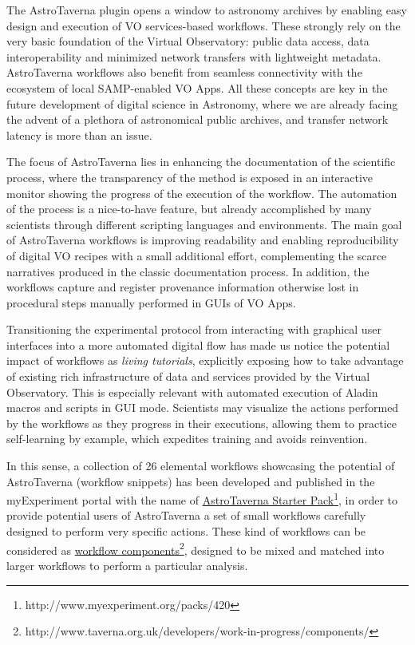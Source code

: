 \documentclass{aa}
\begin{document}
The AstroTaverna plugin opens a window to astronomy archives by enabling easy design and execution of VO services-based workflows. These strongly rely on the very basic foundation of the Virtual Observatory: public data access, data interoperability and minimized network transfers with lightweight metadata. AstroTaverna workflows also benefit from seamless connectivity with the ecosystem of local SAMP-enabled VO Apps. All these concepts are key in the future development of digital science in Astronomy, where we are already facing the advent of a plethora of astronomical public archives, and transfer network latency is more than an issue. 

The focus of AstroTaverna lies in enhancing the documentation of the scientific process, where the transparency of the method is exposed in an interactive monitor showing the progress of the execution of the workflow. The automation of the process is a nice-to-have feature, but already accomplished by many scientists through different scripting languages and environments. The main goal of AstroTaverna workflows is improving readability and enabling reproducibility of digital VO recipes with a small additional effort, complementing the scarce narratives produced in the classic documentation process. In addition, the workflows capture and register provenance information otherwise lost in procedural steps manually performed in GUIs of VO Apps. 

Transitioning the experimental protocol from interacting with graphical user interfaces into a more automated digital flow has made us notice the potential impact of workflows as \textit{living tutorials}, explicitly exposing how to take advantage of existing rich infrastructure of data and services provided by the Virtual Observatory. This is especially relevant with automated execution of Aladin macros and scripts in GUI mode. Scientists may visualize the actions performed by the workflows as they progress in their executions, allowing them to practice self-learning by example, which expedites training and avoids reinvention. 

In this sense, a collection of 26 elemental workflows showcasing the potential of AstroTaverna (workflow snippets) has been developed and published in the myExperiment portal with the name of \href{http://www.myexperiment.org/packs/420}{AstroTaverna Starter Pack}\footnote{\label{starterpack}http://www.myexperiment.org/packs/420}, in order to provide potential users of AstroTaverna a set of small workflows carefully designed to perform very specific actions. These kind of workflows can be considered as \href{http://www.taverna.org.uk/developers/work-in-progress/components/}{workflow components}\footnote{http://www.taverna.org.uk/developers/work-in-progress/components/}, designed to be mixed and matched into larger workflows to perform a particular analysis. 
\end{document}
